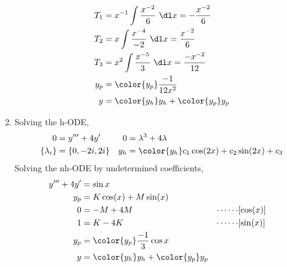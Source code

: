 \begin{enumerate}
\begin{align}
              T_1                                &
              = x^{-1} \int \frac{x^{-2}}{6}\ \dl x
              = -\frac{x^{-2}}{6}                                              \\
              T_2                                &
              = x \int \frac{x^{-4}}{-2}\ \dl x
              = \frac{x^{-2}}{6}                                               \\
              T_3                                &
              = x^{2} \int \frac{x^{-5}}{3}\ \dl x
              = \frac{-x^{-2}}{12}                                             \\
              y_{p}                              &
              = \color{y_p} \frac{-1}{12x^{2}}                                 \\
              y                                  &
              = {\color{y_h} y_{h}} + {\color{y_p} y_{p}}
          \end{align}

    \item Solving the h-ODE,
          \begin{align}
              0               & = y''' + 4y'                                    &
              0               & = \lambda^{3} + 4\lambda                          \\
              \{\lambda_{i}\} & = \{0, -2i, 2i\}                                &
              y_{h}           & = \color{y_h} c_1 \cos(2x) + c_2 \sin(2x) + c_3
          \end{align}
          Solving the nh-ODE by undetermined coefficients,
          \begin{align}
              y''' + 4y'   & = \sin x                                      \\
              y_{p}        & = K\cos(x) + M\sin(x)                         \\
              0            & = -M + 4M                                   &
              \cdots\cdots & [\cos(x)]                                     \\
              1            & = K - 4K                                    &
              \cdots\cdots & [\sin(x)]                                     \\
              y_{p}        & = \color{y_p} \frac{-1}{3}\cos x              \\
              y            & = {\color{y_h} y_{h}} + {\color{y_p} y_{p}}
          \end{align}


\end{enumerate}
